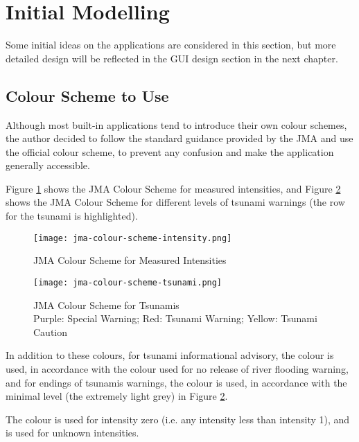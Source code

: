 \section{Initial Modelling}
Some initial ideas on the applications are considered in this section, but more detailed design will be reflected in the GUI design section in the next chapter.

\subsection{Colour Scheme to Use}
Although most built-in applications tend to introduce their own colour schemes, the author decided to follow the standard guidance provided by the JMA \autocite{jma-colour-guidance} and use the official colour scheme, to prevent any confusion and make the application generally accessible.

Figure \ref{fig:jma-colour-scheme-intensity} shows the JMA Colour Scheme for measured intensities, and Figure \ref{fig:jma-colour-scheme-tsunami} shows the JMA Colour Scheme for different levels of tsunami warnings (the row for the tsunami is highlighted).

\begin{figure}[htp]
    \centering

    \texttt{[image: jma-colour-scheme-intensity.png]}
    \caption{JMA Colour Scheme for Measured Intensities}
    \label{fig:jma-colour-scheme-intensity}
\end{figure}

\begin{figure}[htp]
    \centering

    \texttt{[image: jma-colour-scheme-tsunami.png]}
    \caption[JMA Colour Scheme for Tsunamis]{JMA Colour Scheme for Tsunamis\\
        Purple: Special Warning; Red: Tsunami Warning; Yellow: Tsunami Caution}
    \label{fig:jma-colour-scheme-tsunami}
\end{figure}

In addition to these colours, for tsunami informational advisory, the colour  is used, in accordance with the colour used for no release of river flooding warning, and for endings of tsunamis warnings, the colour  is used, in accordance with the minimal level (the extremely light grey) in Figure \ref{fig:jma-colour-scheme-tsunami}.

The colour  is used for intensity zero (i.e. any intensity less than intensity 1), and  is used for unknown intensities.

